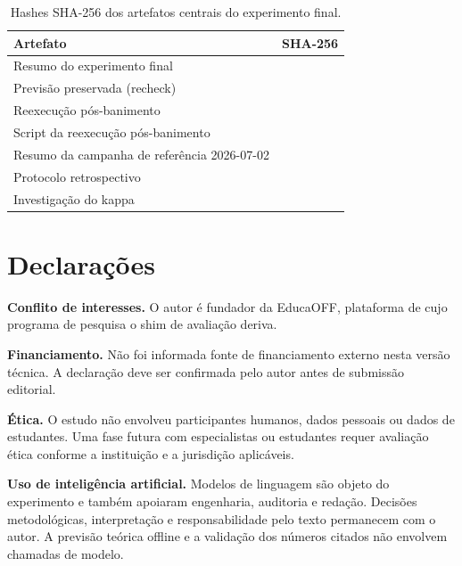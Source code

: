 \documentclass[11pt,a4paper]{article}
\begin{document}
\begin{table}[tbp]
\centering
\caption{Hashes SHA-256 dos artefatos centrais do experimento final.}
\label{tab:hashes}
\footnotesize
\setlength{\tabcolsep}{4pt}
\begin{tabularx}{\textwidth}{@{}P{5.1cm}Y@{}}
\toprule
Artefato & SHA-256 \\
\midrule
Resumo do experimento final &  \\
Previsão preservada (recheck) &  \\
Reexecução pós-banimento &  \\
Script da reexecução pós-banimento &  \\
Resumo da campanha de referência 2026-07-02 &  \\
Protocolo retrospectivo &  \\
Investigação do kappa &  \\
\bottomrule
\end{tabularx}
\end{table}
\FloatBarrier

\section*{Declarações}

\textbf{Conflito de interesses.} O autor é fundador da EducaOFF, plataforma de cujo programa de pesquisa o shim de avaliação deriva.

\textbf{Financiamento.} Não foi informada fonte de financiamento externo nesta versão técnica. A declaração deve ser confirmada pelo autor antes de submissão editorial.

\textbf{Ética.} O estudo não envolveu participantes humanos, dados pessoais ou dados de estudantes. Uma fase futura com especialistas ou estudantes requer avaliação ética conforme a instituição e a jurisdição aplicáveis.

\textbf{Uso de inteligência artificial.} Modelos de linguagem são objeto do experimento e também apoiaram engenharia, auditoria e redação. Decisões metodológicas, interpretação e responsabilidade pelo texto permanecem com o autor. A previsão teórica offline e a validação dos números citados não envolvem chamadas de modelo.
\end{document}
